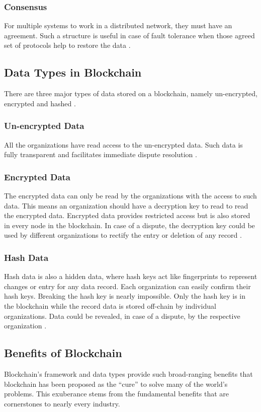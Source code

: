 \documentclass[sigconf]{acmart}
\begin{document}
\subsubsection{Consensus} For multiple systems to work in a distributed network, they must have an agreement. Such a structure is useful in case of fault tolerance when those agreed set of protocols help to restore the data \cite{pabc1}.

\subsection{Data Types in Blockchain}
There are three major types of data stored on a blockchain, namely un-encrypted, encrypted and hashed \cite{arbc1}. 

\subsubsection{Un-encrypted Data} All the organizations have read access to the un-encrypted data. Such data is fully transparent and facilitates immediate dispute resolution \cite{arbc1}.

\subsubsection{Encrypted Data} The encrypted data can only be read by the organizations with the access to such data. This means an organization should have a decryption key to read to read the encrypted data. Encrypted data provides restricted access but is also stored in every node in the blockchain. In case of a dispute, the decryption key could be used by different organizations to rectify the entry or deletion of any record \cite{arbc1}.

\subsubsection{Hash Data} Hash data is also a hidden data, where hash keys act like fingerprints to represent changes or entry for any data record. Each organization can easily confirm their hash keys. Breaking the hash key is nearly impossible. Only the hash key is in the blockchain while the record data is stored off-chain by individual organizations. Data could be revealed, in case of a dispute, by the respective organization \cite{arbc1}.

\subsection{Benefits of Blockchain}
Blockchain's framework and data types provide such broad-ranging benefits that blockchain has been proposed as the ``cure'' to solve many of the world's problems. This exuberance stems from the fundamental benefits that are cornerstones to nearly every industry.
\end{document}
